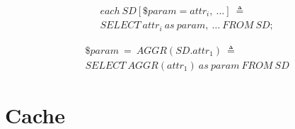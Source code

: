 \begin{align*}%
&each\ SD[\$param = attr_i,\ \ldots]\ \triangleq\\
&SELECT\ attr_i\ as\ param,\ \ldots\ FROM\ SD;
\end{align*}

\begin{align*}%
&\$param\ =\ AGGR(SD.attr_1)\ \triangleq\\
&SELECT\ AGGR(attr_1)\ as\ param\ FROM\ SD
\end{align*}

\section{Cache}